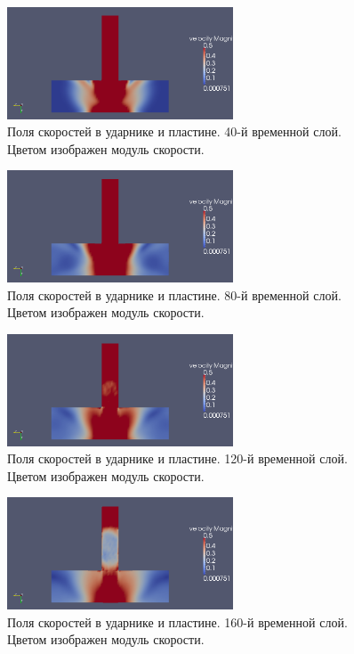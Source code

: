 \begin{figure}[htp]
\centering
\includegraphics[width=0.6\textwidth]{png/strike-test/both-2d/0040.png}
\caption{Поля скоростей в ударнике и пластине. 40-й временной слой. Цветом изображен модуль скорости.}
\end{figure}

\begin{figure}[htp]
\centering
\includegraphics[width=0.6\textwidth]{png/strike-test/both-2d/0080.png}
\caption{Поля скоростей в ударнике и пластине. 80-й временной слой. Цветом изображен модуль скорости.}
\end{figure}

\begin{figure}[htp]
\centering
\includegraphics[width=0.6\textwidth]{png/strike-test/both-2d/0120.png}
\caption{Поля скоростей в ударнике и пластине. 120-й временной слой. Цветом изображен модуль скорости.}
\end{figure}

\begin{figure}[htp]
\centering
\includegraphics[width=0.6\textwidth]{png/strike-test/both-2d/0160.png}
\caption{Поля скоростей в ударнике и пластине. 160-й временной слой. Цветом изображен модуль скорости.}
\end{figure}

